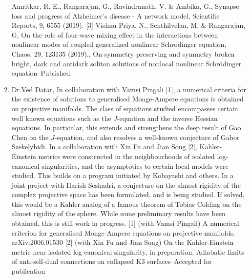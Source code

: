 \begin{enumerate}
Amritkar, R. E., Rangarajan, G., Ravindranath, V. & Ambika, G., Synapse loss and progress of Alzheimer’s disease - A network model, Scientific Reports, 9, 6555 (2019).   [3] Vishnu Priya, N., Senthilvelan, M. &  Rangarajan, G, On the role of four-wave mixing effect in the interactions between nonlinear modes of coupled generalized nonlinear Schrodinger equation, Chaos, 29, 123135 (2019)., On symmetry preserving and symmetry broken bright, dark and antidark soliton solutions of nonlocal nonlinear Schrödinger equation--Published
\item Dr.Ved Datar, In collaboration with Vamsi Pingali [1],  a numerical criteria for the existence of solutions to generalised Monge-Ampere equations is obtained  on projective manifolds. The class of equations studied encompasses certain well known equations such as the $J$-equation and the inverse Hessian equations. In particular, this extends and strengthens the deep result of Gao Chen on the $J$-equation, and also resolves a well-known conjecture of Gabor Szekelyhidi.   In a collaboration with Xin Fu and Jian Song [2], Kahler-Einstein metrics were constructed in the neighbourhoods of isolated log-canonical singularities, and the asymptotics to certain local models were studied. This builds on a program initiated by Kobayashi and others.    In a joint project with Harish Seshadri, a conjecture on the almost rigidity of the complex projective space has been formulated, and is being studied. If solved, this would be a Kahler analog of a famous theorem of Tobias Colding on the almost rigidity of the sphere. While some preliminary results have been obtained, this is still work in progress.  [1] (with Vamsi Pingali) A numerical criterion for generalised Monge-Ampere equations on projective manifolds, arXiv:2006.01530 [2] (with Xin Fu and Jian Song) On the Kahler-Einstein metric near isolated log-canonical singularity,  in  preparation, Adiabatic limits of anti-self-dual connections on collapsed K3 surfaces--Accepted for publication

\end{enumerate}
